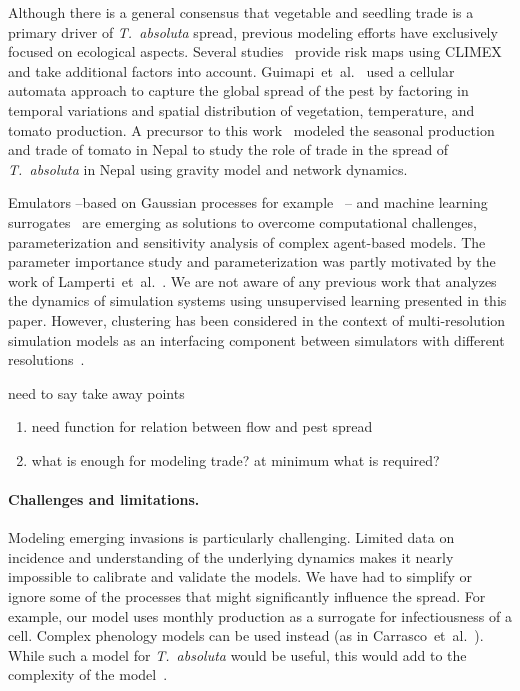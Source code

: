\documentclass[11pt]{article}
\newcommand{\tuta}{\emph{T.~absoluta}}
\theoremstyle{definition}
\begin{document}
Although there is a general consensus that vegetable and seedling trade is
a primary driver of \tuta{} spread, previous modeling efforts have
exclusively focused on ecological aspects. Several
studies~\cite{desneux2010biological,tonnang2015identification} provide risk
maps using CLIMEX and take additional factors into account.
Guimapi~et~al.~\cite{guimapi2016modeling} used a cellular automata approach
to capture the global spread of the pest by factoring in temporal
variations and spatial distribution of vegetation, temperature, and tomato
production. A precursor to this work~\cite{venkatramanan2019modeling}
modeled the seasonal production and trade of tomato in Nepal to study the
role of trade in the spread of \tuta{} in Nepal using gravity model and
network dynamics.

Emulators --based on Gaussian processes for
example~\cite{fadikar2018calibrating} -- and machine learning
surrogates~\cite{lamperti2018agent} are emerging as solutions to overcome
computational challenges, parameterization and sensitivity analysis of
complex agent-based models. The parameter importance study and
parameterization was partly motivated by the work of
Lamperti~et~al.~\cite{lamperti2018agent}. We are not aware of any previous
work that analyzes the dynamics of simulation systems using unsupervised
learning presented in this paper. However, clustering has been considered
in the context of multi-resolution simulation models as an interfacing
component between simulators with different
resolutions~\cite{cassandras2000clustering}.

need to say take away points
\begin{enumerate}
    \item need function for relation between flow and pest spread
    \item what is enough for modeling trade? at minimum what is
    required?
\end{enumerate}

\paragraph{Challenges and limitations.} Modeling emerging invasions is
particularly challenging. Limited data on incidence and understanding of
the underlying dynamics makes it nearly impossible to calibrate and
validate the models.   We have had to simplify or ignore some of the
processes that might significantly influence the spread.  For example, our
model uses monthly production as a surrogate for infectiousness of a cell.
Complex phenology models can be used instead (as in
Carrasco~et~al.~\cite{carrasco2010unveiling}). While such a model for
\tuta{} would be useful, this would add to the complexity of the
model~\cite{robinet2012suite}.
\end{document}
